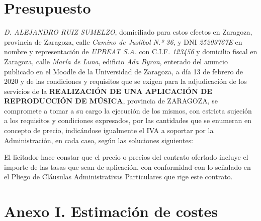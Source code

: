 \documentclass{article}
\begin{document}
\section{Presupuesto}
\textit{D. ALEJANDRO RUIZ SUMELZO}, domiciliado para estos efectos en Zaragoza, provincia de Zaragoza, calle \textit{Camino de Juslibol N.º 36}, y DNI \textit{25203767E} en nombre y representación de \textit{UPBEAT S.A.} con C.I.F. \textit{123456} y domicilio fiscal en Zaragoza, calle \textit{María de Luna}, edificio \textit{Ada Byron}, enterado del anuncio publicado en el Moodle de la Universidad de Zaragoza, a día 13 de febrero de 2020 y de las condiciones y requisitos que se exigen para la adjudicación de los servicios de la \textbf{REALIZACIÓN DE UNA APLICACIÓN DE REPRODUCCIÓN DE MÚSICA}, provincia de ZARAGOZA, se compromete a tomar a su cargo la ejecución de los mismos, con estricta sujeción a los requisitos y condiciones expresados, por las cantidades que se enumeran en concepto de precio, indicándose igualmente el IVA a soportar por la Administración, en cada caso, según las soluciones siguientes:

\begin{figure}[H]
\end{figure}

El licitador hace constar que el precio o precios del contrato ofertado incluye el importe de las tasas que sean de aplicación, con conformidad con lo señalado en el Pliego de Cláusulas Administrativas Particulares que rige este contrato. 
\newpage
\section*{Anexo I. Estimación de costes}
\begin{figure}[H]
	\hspace*{-3.5cm}
\end{figure}
\end{document}
